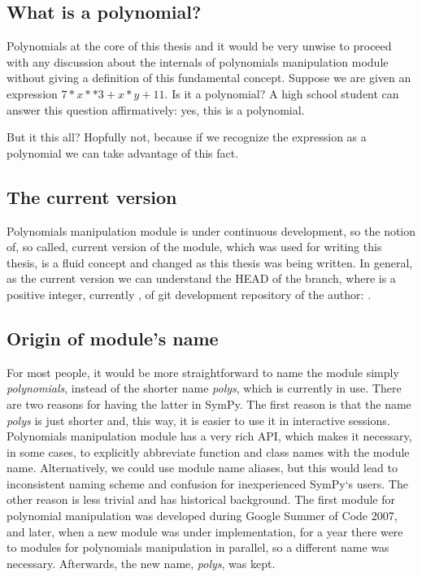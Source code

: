 \subsection{What is a polynomial?}

Polynomials at the core of this thesis and it would be very unwise to proceed with any discussion about
the internals of polynomials manipulation module without giving a definition of this fundamental concept.
Suppose we are given an expression $7*x**3 + x*y + 11$. Is it a polynomial? A high school student can
answer this question affirmatively: yes, this is a polynomial.

But it this all? Hopfully not, because
if we recognize the expression as a polynomial we can take advantage of this fact.


\subsection{The current version}

Polynomials manipulation module is under continuous development, so the notion of, so called, current
version of the module, which was used for writing this thesis, is a fluid concept and changed as this
thesis was being written. In general, as the current version we can understand the HEAD of the 
branch, where  is a positive integer, currently , of git development repository of the
author: .


\subsection{Origin of module's name}

For most people, it would be more straightforward to name the module simply \emph{polynomials}, instead
of the shorter name \emph{polys}, which is currently in use. There are two reasons for having the latter
in SymPy. The first reason is that the name \emph{polys} is just shorter and, this way, it is easier to
use it in interactive sessions. Polynomials manipulation module has a very rich API, which makes it
necessary, in some cases, to explicitly abbreviate function and class names with the module name.
Alternatively, we could use module name aliases, but this would lead to inconsistent naming scheme
and confusion for inexperienced SymPy`s users. The other reason is less trivial and has historical
background. The first module for polynomial manipulation was developed during Google Summer of Code
2007, and later, when a new module was under implementation, for a year there were to modules for
polynomials manipulation in parallel, so a different name was necessary. Afterwards, the new name,
\emph{polys}, was kept.


